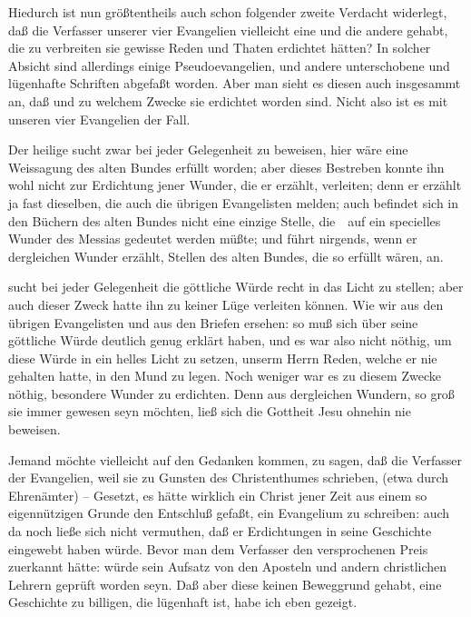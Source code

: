 \begin{aufza}
\begin{aufzb}
\end{aufzb}
\item Hiedurch ist nun größtentheils auch schon folgender zweite Verdacht widerlegt, daß die Verfasser unserer vier Evangelien vielleicht eine und die andere  gehabt, die zu verbreiten sie gewisse Reden und Thaten  erdichtet hätten? In solcher Absicht sind allerdings einige Pseudoevangelien, und andere unterschobene und lügenhafte Schriften abgefaßt worden. Aber man sieht es diesen auch insgesammt an, daß und zu welchem Zwecke sie erdichtet worden sind. Nicht also ist es mit unseren vier Evangelien der Fall.
\begin{aufzb}
\item Der heilige  sucht zwar bei jeder Gelegenheit zu beweisen, hier wäre eine Weissagung des alten Bundes erfüllt worden; aber dieses Bestreben konnte ihn wohl nicht zur Erdichtung jener Wunder, die er erzählt, verleiten; denn er erzählt ja fast dieselben, die auch die übrigen Evangelisten melden; auch befindet sich in den Büchern des alten Bundes nicht eine einzige Stelle, die~\ auf ein specielles Wunder des Messias gedeutet werden müßte; und  führt nirgends, wenn er dergleichen Wunder erzählt, Stellen des alten Bundes, die so erfüllt wären, an.
\item {} sucht bei jeder Gelegenheit die göttliche Würde  recht in das Licht zu stellen; aber auch dieser Zweck hatte ihn zu keiner Lüge verleiten können. Wie wir aus den übrigen Evangelisten und aus den Briefen  ersehen: so muß sich  über seine göttliche Würde deutlich genug erklärt haben, und es war also nicht nöthig, um diese Würde in ein helles Licht zu setzen, unserm Herrn Reden, welche er nie gehalten hatte, in den Mund zu legen. Noch weniger war es zu diesem Zwecke nöthig, besondere Wunder zu erdichten. Denn aus dergleichen Wundern, so groß sie immer gewesen seyn möchten, ließ sich die Gottheit Jesu ohnehin nie beweisen.
\end{aufzb}
\item Jemand möchte vielleicht auf den Gedanken kommen, zu sagen, daß die Verfasser der Evangelien, weil sie zu Gunsten des Christenthumes schrieben,  (etwa durch Ehrenämter)  -- Gesetzt, es hätte wirklich ein Christ jener Zeit aus einem so eigennützigen Grunde den Entschluß gefaßt, ein Evangelium  zu schreiben: auch da noch ließe sich nicht vermuthen, daß er Erdichtungen in seine Geschichte eingewebt haben würde. Bevor man dem Verfasser den versprochenen Preis zuerkannt hätte: würde sein Aufsatz von den Aposteln und andern christlichen Lehrern geprüft worden seyn. Daß aber diese keinen Beweggrund gehabt, eine Geschichte zu billigen, die lügenhaft ist, habe ich eben gezeigt.

\end{aufza}
